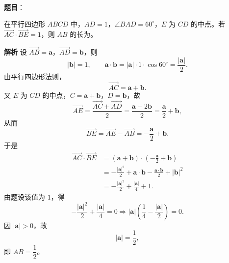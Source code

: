 \begin{answer}

\textbf{题目}：

在平行四边形 $ABCD$ 中，$AD=1$，$\angle BAD=60^\circ$，$E$ 为 $CD$ 的中点。若 $\overrightarrow{AC}\cdot\overrightarrow{BE}=1$，则 $AB$ 的长为\gkblank{}。

\textbf{解析}
设 $\overrightarrow{AB}=\boldsymbol a$，$\overrightarrow{AD}=\boldsymbol b$，则
\nopagebreak[4]
\[|\boldsymbol b|=1,\qquad \boldsymbol a\cdot\boldsymbol b=|\boldsymbol a|\cdot1\cdot\cos60^\circ=\frac{|\boldsymbol a|}{2}.\]
由平行四边形法则，
\nopagebreak[4]
\[\overrightarrow{AC}=\boldsymbol a+\boldsymbol b.\]
又 $E$ 为 $CD$ 的中点，$C=\boldsymbol a+\boldsymbol b$，$D=\boldsymbol b$，故
\nopagebreak[4]
\[\overrightarrow{AE}=\frac{\overrightarrow{AC}+\overrightarrow{AD}}2
=\frac{\boldsymbol a+2\boldsymbol b}{2}
=\frac{\boldsymbol a}{2}+\boldsymbol b,\]
从而
\nopagebreak[4]
\[\overrightarrow{BE}=\overrightarrow{AE}-\overrightarrow{AB}
=-\frac{\boldsymbol a}{2}+\boldsymbol b.\]
于是
\nopagebreak[4]
\[\begin{aligned}
\overrightarrow{AC}\cdot\overrightarrow{BE}
&=(\boldsymbol a+\boldsymbol b)\cdot\left(-\frac{\boldsymbol a}{2}+\boldsymbol b\right)\\
&=-\frac{|\boldsymbol a|^2}{2}+\boldsymbol a\cdot\boldsymbol b
-\frac{\boldsymbol a\cdot\boldsymbol b}{2}+|\boldsymbol b|^2\\
&=-\frac{|\boldsymbol a|^2}{2}+\frac{|\boldsymbol a|}{4}+1.
\end{aligned}\]
由题设该值为 $1$，得
\nopagebreak[4]
\[-\frac{|\boldsymbol a|^2}{2}+\frac{|\boldsymbol a|}{4}=0
\Longrightarrow |\boldsymbol a|\left(\frac14-\frac{|\boldsymbol a|}{2}\right)=0.\]
因 $|\boldsymbol a|>0$，故
\nopagebreak[4]
\[|\boldsymbol a|=\frac12,\]
即 $AB=\dfrac12$。


\end{answer}
